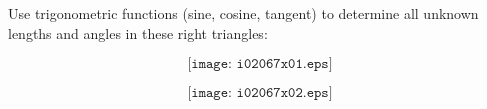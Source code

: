 

Use trigonometric functions (sine, cosine, tangent) to determine all unknown lengths and angles in these right triangles:

$$\texttt{[image: i02067x01.eps]}$$







$$\texttt{[image: i02067x02.eps]}$$











